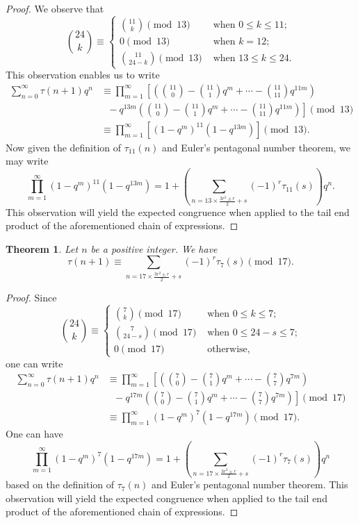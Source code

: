 \documentclass[10pt]{article}
\newtheorem{theorem}{Theorem}[section]
\theoremstyle{definition}
\begin{document}
\begin{proof}
We observe that 
\[{24\choose{k}}\equiv\begin{cases}
{11\choose{k}}\pmod{13}&\text{ when $0\leq k\leq 11$;}\\
0\pmod{13}&\text{ when $k=12$;}\\ 
{11\choose{24-k}}\pmod{13}&\text{ when $13\leq k\leq 24$.}
\end{cases}
\]
This observation enables us to write
\begin{align*}
\sum_{n=0}^{\infty}\tau(n+1)q^n
&\equiv\prod_{m=1}^{\infty}\left[\left({11\choose{0}}-{11\choose{1}}q^m+\cdots -{11\choose{11}}q^{11m}\right)\right.\\
&\text{\ \ \ \ \ \ \ \ }-q^{13m}\left.\left({11\choose{0}}-{11\choose{1}}q^m+\cdots -{11\choose{11}}q^{11m}\right)\right]\pmod{13}\\
&\equiv \prod_{m=1}^{\infty}\left[(1-q^m)^{11}(1-q^{13m})\right]\pmod{13}.
\end{align*}
Now given the definition of $\tau_{11}(n)$ and Euler's pentagonal number theorem, we may write 
\[\prod_{m=1}^{\infty}(1-q^m)^{11}(1-q^{13m})=1+\left(\sum_{n=13\times\frac{3r^2\pm r}{2}+s}(-1)^r\tau_{11}(s)\right)q^n.
\]
This observation will yield the expected congruence when applied to the tail end product of the aforementioned chain of expressions.
\end{proof}
\begin{theorem}
Let $n$ be a positive integer. We have
\begin{equation}
\tau(n+1)\equiv\sum_{n=17\times\frac{3r^2\pm r}{2}+s}(-1)^r\tau_7(s)\pmod{17}.
\end{equation}
\end{theorem}
\begin{proof}
Since
\[{24\choose{k}}\equiv\begin{cases}
{7\choose{k}}\pmod{17}&\text{ when $0\leq k\leq 7$;}\\ 
{7\choose{24-s}}\pmod{17}&\text{ when $0\leq 24-s\leq 7$;}\\ 
0\pmod{17}&\text{ otherwise,}
\end{cases}
\]
one can write
\begin{align*}
\sum_{n=0}^{\infty}\tau(n+1)q^n
&\equiv\prod_{m=1}^{\infty}\left[\left({7\choose{0}}-{7\choose{1}}q^m+\cdots -{7\choose{7}}q^{7m}\right)\right.\\
&\text{\ \ \ \ \ \ \ \ }-q^{17m}\left.\left({7\choose{0}}-{7\choose{1}}q^m+\cdots -{7\choose{7}}q^{7m}\right)\right]\pmod{17}\\
&\equiv \prod_{m=1}^{\infty}(1-q^m)^{7}(1-q^{17m})\pmod{17}.
\end{align*}
One can have
\[\prod_{m=1}^{\infty}(1-q^m)^{7}(1-q^{17m})=1+\left(\sum_{n=17\times\frac{3r^2\pm r}{2}+s}(-1)^r\tau_7(s)\right)q^n
\]
based on the definition of $\tau_7(n)$ and Euler's pentagonal number theorem. This observation will yield the expected congruence when applied to the tail end product of the aforementioned chain of expressions.
\end{proof}
\end{document}
